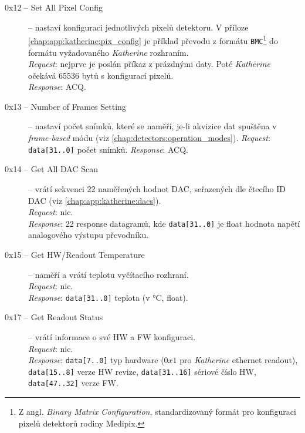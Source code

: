 \begin{description}

    \item[0x12 -- Set All Pixel Config] -- nastaví konfiguraci jednotlivých pixelů detektoru. V příloze \ref{chap:app:katherine:pix_config} je příklad převodu z formátu \texttt{BMC}\footnote{Z angl. \textit{Binary Matrix Configuration}, standardizovaný formát pro konfiguraci pixelů detektorů rodiny Medipix.} do formátu vyžadovaného \textit{Katherine} rozhraním.
    \\\textit{Request}: nejprve je poslán příkaz z prázdnými daty. Poté \textit{Katherine} očekává 65536 bytů s konfigurací pixelů.
    \\\textit{Response}: ACQ.

    \item[0x13 -- Number of Frames Setting] -- nastaví počet snímků, které se naměří, je-li akvizice dat spuštěna v \textit{frame-based} módu (viz \ref{chap:detectors:operation_modes}).
    \textit{Request}: \texttt{data[31..0]} počet snímků.
    \textit{Response}: ACQ.

    \item[0x14 -- Get All DAC Scan] -- vrátí sekvenci 22 naměřených hodnot DAC, seřazených dle čtecího ID DAC (viz \ref{chap:app:katherine:dacs}).
    \\\textit{Request}: nic.
    \\\textit{Response}: 22 response datagramů, kde \texttt{data[31..0]} je float hodnota napětí analogového výstupu převodníku.

    \item[0x15 -- Get HW/Readout Temperature] -- naměří a vrátí teplotu vyčítacího rozhraní.
    \\\textit{Request}: nic.
    \\\textit{Response}: \texttt{data[31..0]} teplota (v °C, float).

    
    \item[0x17 -- Get Readout Status] -- vrátí informace o své HW a FW konfiguraci.
    \\\textit{Request}: nic.
    \\\textit{Response}: \texttt{data[7..0]} typ hardware ($0x1$ pro \textit{Katherine} ethernet readout),\\\texttt{data[15..8]} verze HW revize, \texttt{data[31..16]} sériové číslo HW, \texttt{data[47..32]} verze FW.


\end{description}
